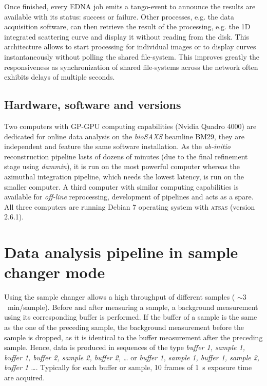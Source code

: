 \documentclass[preprint,pdf]{iucr}              %
\begin{document}
Once finished, every EDNA job emits a tango-event to announce the results are
available with its status: success or failure.
Other processes, e.g. the data acquisition software, can then retrieve the result
of the processing, e.g. the 1D integrated scattering curve and
display it without reading from the disk.
This architecture allows to start processing for individual images or to
display curves instantaneously without polling the shared file-system.
This improves greatly the responsiveness as synchronization of shared
file-systems across the network often exhibits delays of multiple seconds.

\subsection{Hardware, software and versions}
Two computers with GP-GPU computing capabilities (Nvidia Quadro 4000) are
dedicated for online data analysis on the \textit{bioSAXS} beamline BM29, they are
independent and feature the same software installation.
As the \textit{ab-initio} reconstruction pipeline lasts of dozens of minutes
(due to the final refinement stage using \textit{dammin}), it is run on the most
powerful computer whereas the azimuthal integration pipeline, which needs the lowest
latency, is run on the smaller computer.
A third computer with similar computing capabilities is available for
\textit{off-line} reprocessing, development of pipelines and acts as a spare.
All three computers are running Debian 7 operating system with \textsc{atsas}
(version 2.6.1).



\section{Data analysis pipeline in sample changer mode}

Using the sample changer allows a high throughput of different samples (
$\sim 3$~min/sample).
Before and after measuring a sample, a background measurement using its
corresponding buffer is performed.
If the buffer of a sample is the same as the one of the preceding sample, the
background measurement before the sample is dropped, as it is identical to the
buffer measurement after the preceding sample.
Hence, data is produced in sequences of the type \textit{buffer 1, sample 1,
buffer 1, buffer 2, sample 2, buffer 2, \ldots}  or  \textit{buffer 1, sample 1,
buffer 1,  sample 2, buffer 1 \ldots}.
Typically for each buffer or sample, 10 frames of 1~s exposure time are acquired.
\end{document}
